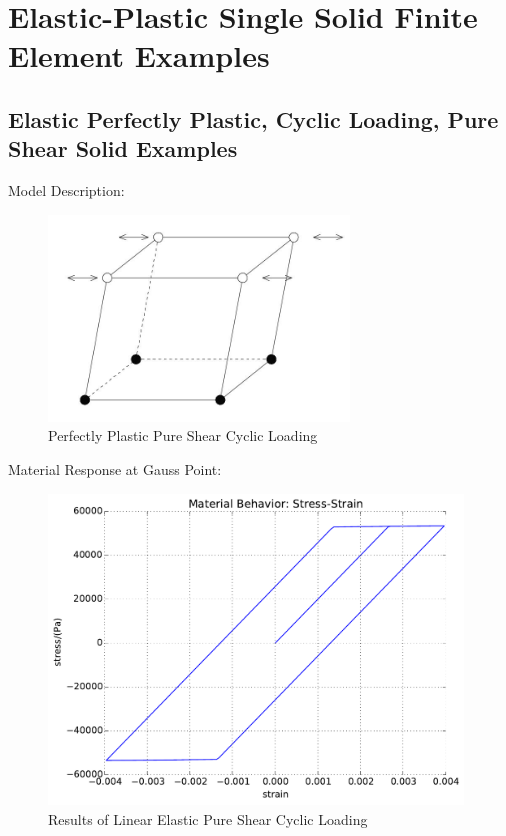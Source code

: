 \documentclass[fleqn,11pt]{article}
\begin{document}
\section{Elastic-Plastic Single Solid Finite Element Examples}
\label{section_elastoplastic_brick_example}
\subsection{Elastic Perfectly Plastic, Cyclic Loading, Pure Shear Solid Examples}

Model Description:

\begin{figure}[H]
\begin{center}
\includegraphics[width=8cm]{../Figure-files/shear_cyclic_brick.JPG}
\caption{
\label{Perfectly Plastic Pure Shear Cyclic Loadin}
Perfectly Plastic Pure Shear Cyclic Loading}
\end{center}
\end{figure}

Material Response at Gauss Point:

\begin{figure}[H]
\begin{center}
\includegraphics[width=11cm]{../fei_examples/perfectly_plastic_pure_shear_solid/2pure_shear_cyclic_loading/result.pdf}
\caption{
\label{Results of Linear Elastic Pure Shear Cyclic Loadin}
Results of Linear Elastic Pure Shear Cyclic Loading}
\end{center}
\end{figure}
\end{document}
